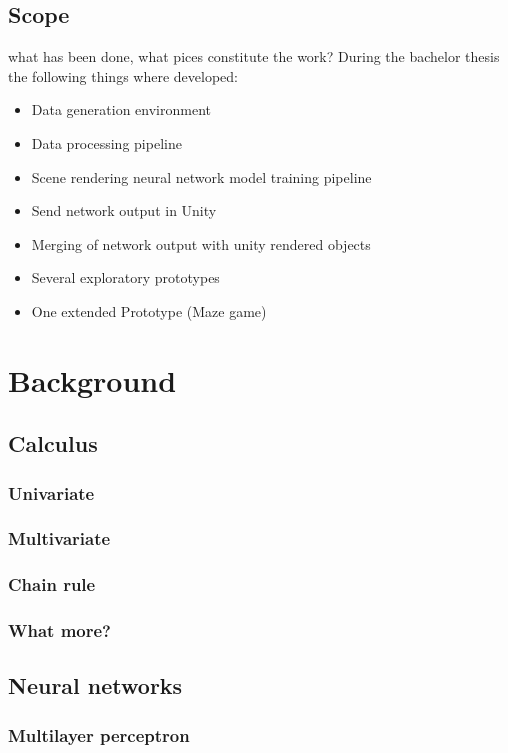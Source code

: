 \documentclass[a4paper, twoside, 10pt]{report}
\begin{document}
\section{Scope}
what has been done, what pices constitute the work?
During the bachelor thesis the following things where developed:

\begin{itemize}
\item{Data generation environment}
\item{Data processing pipeline}
\item{Scene rendering neural network model training pipeline}
\item{Send network output in Unity}
\item{Merging of network output with unity rendered objects}
\item{Several exploratory prototypes}
\item{One extended Prototype (Maze game)}
\end{itemize}



\chapter{Background}

\section{Calculus}
\subsection{Univariate}
\subsection{Multivariate}
\subsection{Chain rule}
\subsection{What more?}
\section{Neural networks}
\subsection{Multilayer perceptron}
\end{document}
